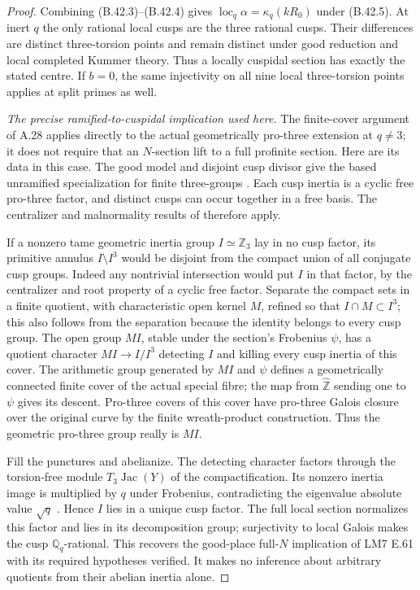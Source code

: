 \begin{proof}
Combining (B.42.3)--(B.42.4) gives
$\operatorname{loc}_q\alpha=\kappa_q(kR_0)$ under (B.42.5).
At inert $q$ the only rational local cusps are the three rational
cusps.  Their differences are distinct three-torsion points and
remain distinct under good reduction and local completed Kummer
theory.  Thus a locally cuspidal section has exactly the stated
centre.  If $b=0$, the same injectivity on all nine local
three-torsion points applies at split primes as well.

\emph{The precise ramified-to-cuspidal implication used here.}
The finite-cover argument of A.28 applies directly to the actual
geometrically pro-three extension at $q\ne3$; it does not require
that an $N$-section lift to a full profinite section.  Here are its
data in this case.  The good model and disjoint cusp divisor give
the based unramified specialization for finite three-groups
\citep[XIII, Corollary 2.9 and construction 2.10]{BSGA1}.
Each cusp inertia is a cyclic free pro-three factor, and distinct
cusps can occur together in a free basis.  The centralizer and
malnormality results of \citet[Theorems A' and B']{cHerfortRibes1985}
therefore apply.

If a nonzero tame geometric inertia group $I\simeq\mathbb Z_3$
lay in no cusp factor, its primitive annulus $I\setminus I^3$
would be disjoint from the compact union of all conjugate cusp
groups.  Indeed any nontrivial intersection would put $I$ in
that factor, by the centralizer and root property of a cyclic
free factor.  Separate the compact sets in a finite quotient,
with characteristic open kernel $M$, refined so that
$I\cap M\subset I^3$; this also follows from the separation
because the identity belongs to every cusp group.
The open group $MI$, stable under the section's
Frobenius $\psi$, has a quotient character
$MI\to I/I^3$ detecting $I$ and killing every cusp inertia of
this cover.  The arithmetic group generated by $MI$ and $\psi$
defines a geometrically connected finite cover of the actual
special fibre; the map from $\widehat{\mathbb Z}$ sending one to
$\psi$ gives its descent.  Pro-three covers of this cover have
pro-three Galois closure over the original curve by the finite
wreath-product construction.  Thus the geometric pro-three group
really is $MI$.

Fill the punctures and abelianize.  The detecting character factors
through the torsion-free module $T_3\operatorname{Jac}(Y)$ of the
compactification.  Its nonzero inertia image is multiplied by $q$
under Frobenius, contradicting the eigenvalue absolute value
$\sqrt q$ \citep[II, Theorem 1.1(b); III, Proposition 9.1]{Milne2008}.
Hence $I$ lies in a unique cusp factor.  The full local section
normalizes this factor and lies in its decomposition group;
surjectivity to local Galois makes the cusp $\mathbb Q_q$-rational.
This recovers the good-place full-$N$ implication of LM7 E.61
with its required hypotheses verified.  It makes no inference
about arbitrary quotients from their abelian inertia alone.


\end{proof}
